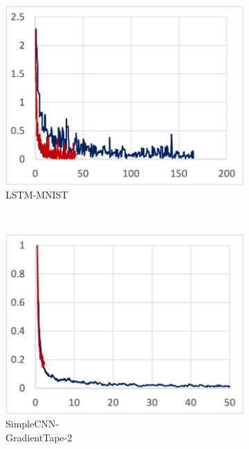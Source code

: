 \begin{figure}[!ht]
  \centering
  \begin{subfigure}[t]{.22\textwidth}
    \includegraphics[width=\textwidth]{tape-lstm}
    \caption{\small LSTM-MNIST}
  \end{subfigure}
  ~ 
  \begin{subfigure}[t]{.22\textwidth}
    \includegraphics[width=\textwidth]{tape-simple2}
    \caption{\small SimpleCNN-\\GradientTape-2}
  \end{subfigure}
  ~
  \begin{subfigure}[t]{.22\textwidth}

\end{subfigure}
\end{figure}
